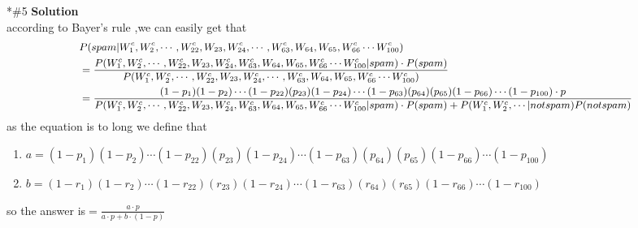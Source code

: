 \documentclass{article}
\newcommand{\solution}{\textbf{\Large Solution}}
\begin{document}
\begin{homeworkProblem}*{\#5}
    \solution
    \\
    according to Bayer's rule ,we can easily get that 
    \begin{equation}
        \notag
        \small
    \begin{aligned}
    &P(spam|W_1^c,W_2^c,\cdots,W_{22}^c,W_{23},W_{24}^c,\cdots,W_{63}^c,W_{64},W_{65},W_{66}^c\cdots W_{100}^c)\\
    &=\frac{P(W_1^c,W_2^c,\cdots,W_{22}^c,W_{23},W_{24}^c, W_{63}^c,W_{64},W_{65},W_{66}^c
    \cdots W_{100}^c|spam)\cdot P(spam) }
    {P(W_1^c,W_2^c,\cdots,W_{22}^c,W_{23},W_{24}^c,\cdots,W_{63}^c,W_{64},W_{65},W_{66}^c\cdots W_{100}^c)}
    \\
    &=\frac{(1-p_1)(1-p_2)\cdots(1-p_{22})(p_{23})(1-p_{24})\cdots(1-p_{63})(p_{64})(p_{65})(1-p_{66})\cdots(1-p_{100})\cdot p}{P(W_1^c,W_2^c,\cdots,W_{22}^c,W_{23},W_{24}^c, W_{63}^c,W_{64},W_{65},W_{66}^c
    \cdots W_{100}^c|spam)\cdot P(spam)+P(W_1^c,W_2^c,\cdots|not spam)P(not spam)}
\end{aligned}   
\end{equation}
as the equation is to long  we define that 
\begin{enumerate}
    \item $a=(1-p_1)(1-p_2)\cdots(1-p_{22})(p_{23})(1-p_{24})\cdots(1-p_{63})(p_{64})(p_{65})(1-p_{66})\cdots(1-p_{100})$
    \item $b=(1-r_1)(1-r_2)\cdots(1-r_{22})(r_{23})(1-r_{24})\cdots(1-r_{63})(r_{64})(r_{65})(1-r_{66})\cdots(1-r_{100})$
\end{enumerate}
\begin{flushleft}
so the answer is$
=\frac{a\cdot p}{a\cdot p+b\cdot (1-p)}$
\end{flushleft}
\end{homeworkProblem}
\end{document}
